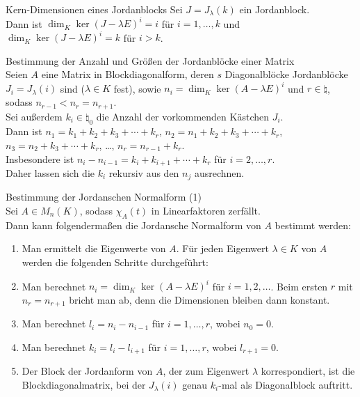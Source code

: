 \begin{Lemma}{Kern-Dimensionen eines Jordanblocks}
    Sei $J = J_\lambda(k)$ ein Jordanblock. \\
    Dann ist $\dim_K \ker(J - \lambda E)^i = i$ für $i = 1, \dotsc, k$ und
    $\dim_K \ker(J - \lambda E)^i = k$ für $i > k$.
\end{Lemma}

\begin{Lemma}{Bestimmung der Anzahl und
              Größen der Jordanblöcke einer Matrix} \\
    Seien $A$ eine Matrix in Blockdiagonalform, deren $s$ Diagonalblöcke
    Jordanblöcke $J_i = J_\lambda(i)$ sind ($\lambda \in K$ fest),
    sowie $n_i = \dim_K \ker(A - \lambda E)^i$ und $r \in \natural$,
    sodass $n_{r - 1} < n_r = n_{r+1}$. \\
    Sei außerdem $k_i \in \natural_0$ die Anzahl der vorkommenden Kästchen
    $J_i$. \\
    Dann ist $n_1 = k_1 + k_2 + k_3 + \dotsb + k_r$, \qquad
    $n_2 = n_1 + k_2 + k_3 + \dotsb + k_r$, \\
    $n_3 = n_2 + k_3 + \dotsb + k_r$, \quad \dots, \quad
    $n_r = n_{r-1} + k_r$. \\
    Insbesondere ist $n_i - n_{i-1} = k_i + k_{i+1} + \dotsb + k_r$ für
    $i = 2, \dotsc, r$. \\
    Daher lassen sich die $k_i$ rekursiv aus den $n_j$ ausrechnen.
\end{Lemma}

\begin{Prozedur}{Bestimmung der Jordanschen Normalform (1)} \\
    Sei $A \in M_n(K)$, sodass $\chi_A(t)$ in Linearfaktoren zerfällt. \\
    Dann kann folgendermaßen die Jordansche Normalform von $A$ bestimmt werden:
    \begin{enumerate}
        \item Man ermittelt die Eigenwerte von $A$.
        Für jeden Eigenwert $\lambda \in K$ von $A$ werden die folgenden
        Schritte durchgeführt:

        \item Man berechnet $n_i = \dim_K \ker(A - \lambda E)^i$ für
        $i = 1, 2, \dotsc$.
        Beim ersten $r$ mit $n_r = n_{r+1}$ bricht man ab, denn
        die Dimensionen bleiben dann konstant.

        \item Man berechnet $l_i = n_i - n_{i-1}$ für $i = 1, \dotsc, r$,
        wobei $n_0 = 0$.

        \item Man berechnet $k_i = l_i - l_{i+1}$ für $i = 1, \dotsc, r$,
        wobei $l_{r+1} = 0$.

        \item Der Block der Jordanform von $A$, der zum Eigenwert $\lambda$
        korrespondiert, ist die Blockdiagonalmatrix, bei der
        $J_\lambda(i)$ genau $k_i$-mal als Diagonalblock auftritt.
    \end{enumerate}
\end{Prozedur}

